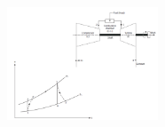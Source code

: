 \documentclass[10pt,compress]{beamer}
\begin{document}
\begin{frame}
\begin{columns}
\begin{column}[c]{0.6\linewidth}
\begin{enumerate}[(1)]
 \end{enumerate}
  \end{column}
  \begin{column}[c]{0.4\linewidth}
    \begin{center}
   \begin{figure}%
     \includegraphics[height=5.cm,width=4.5cm,clip]{./Pics/Brayton_cycle3}
   \end{figure}  
    \end{center}
  \end{column}  
 \end{columns}
\end{frame}
\end{document}
